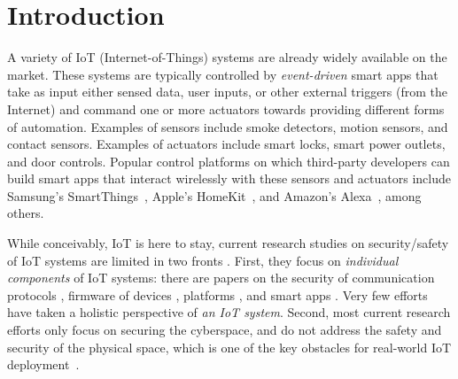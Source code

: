 \chapter{Introduction}
A variety of IoT (Internet-of-Things)
systems
are already widely available on the market.
These systems are typically controlled by \textit{event-driven} smart apps
that take as input either sensed data, user inputs, or other external triggers (from the Internet)
and command one or more actuators towards providing different forms of automation.
Examples of sensors include smoke detectors, motion sensors, and contact sensors.
Examples of actuators include smart locks, smart power {\color{black}outlets}, and door controls.
Popular control platforms on which third-party developers can build smart apps
that interact wirelessly with these sensors and actuators include
Samsung's SmartThings~\cite{Samsung:smartthings}, Apple's HomeKit~\cite{Apple:homekit},
and
Amazon's Alexa~\cite{Amazon:alexa}, among others.

While conceivably, IoT is here to stay,
current research studies on security/safety of IoT systems are limited in two fronts \cite{2018arXiv181009551N}.
First, they focus on \emph{individual components} of IoT systems:
there are papers on the security of communication protocols
\cite{Dolly2016,Fouladi2013,Ho2016:smartlock,Lomas:zigbeeflaw,Eyal:iotworm,doi:10.1177/1550147718767605,5476636,5506358},
firmware of devices
\cite{7815045,6983801,8047972,7483485,7581459,Costin:analysis},
{\color{black}platforms}
\cite{Earlence:flowfence,Jia:contexiot},
and smart apps
\cite{Earlence:smarthomesecurityanalysis,Earlence:flowfence,Jia:contexiot,203866}.
{\color{black}Very few efforts have} %
taken a holistic perspective of \emph{an IoT system}.
Second, most current research efforts only focus on securing the cyberspace,
and do not address the safety and security of the physical space,
which is one of the key obstacles for real-world IoT deployment~\cite{iot_security_news,2018arXiv180906962B}.


